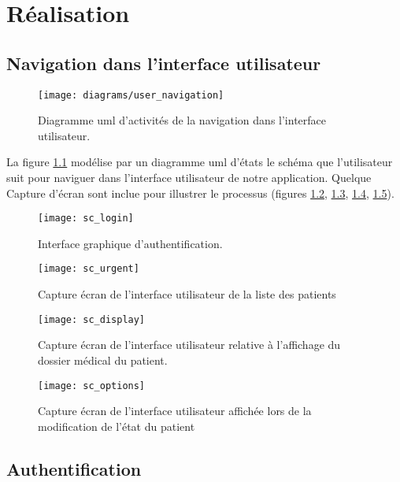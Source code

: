 \chapter{Réalisation}


\section{Navigation dans l'interface utilisateur}

\begin{figure}
\center
\texttt{[image: diagrams/user\_navigation]}
\caption{Diagramme \gls{uml} d'activités de la navigation dans l'interface utilisateur.}
\label{fig:uml_act_ui}
\end{figure}

La figure \ref{fig:uml_act_ui} modélise par un diagramme \gls{uml} d'états le schéma que l'utilisateur suit pour naviguer dans l'interface utilisateur de notre application. Quelque Capture d'écran sont inclue pour illustrer le processus (figures \ref{fig:sc_login}, \ref{fig:sc_urgent}, \ref{fig:sc_display}, \ref{fig:sc_options}).

\begin{figure}
\center
\texttt{[image: sc\_login]}
\caption{Interface graphique d'authentification.}
\label{fig:sc_login}
\end{figure}

\begin{figure}
\center
\texttt{[image: sc\_urgent]}
\caption{Capture écran de l'interface utilisateur de la liste des patients}
\label{fig:sc_urgent}
\end{figure}

\begin{figure}
\center
\texttt{[image: sc\_display]}
\caption{Capture écran de l'interface utilisateur relative à l'affichage du dossier médical du patient.}
\label{fig:sc_display}
\end{figure}

\begin{figure}
\center
\texttt{[image: sc\_options]}
\caption{Capture écran de l'interface utilisateur affichée lors de la modification de l’état du patient}
\label{fig:sc_options}
\end{figure}

\section{Authentification}

